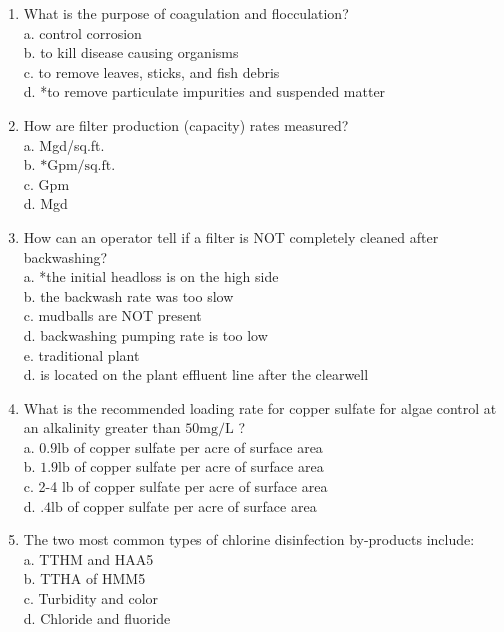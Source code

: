 \begin{enumerate}
\item What is the purpose of coagulation and flocculation?\\
a. control corrosion\\
b. to kill disease causing organisms\\
c. to remove leaves, sticks, and fish debris\\
d. *to remove particulate impurities and suspended matter\\
\item How are filter production (capacity) rates measured?\\
a. Mgd/sq.ft.\\
b. $* \mathrm{Gpm} / \mathrm{sq} . \mathrm{ft}$.\\
c. $\mathrm{Gpm}$\\
d. Mgd\\
\item How can an operator tell if a filter is NOT completely cleaned after backwashing?\\
a. *the initial headloss is on the high side\\
b. the backwash rate was too slow\\
c. mudballs are NOT present\\
d. backwashing pumping rate is too low\\
e. traditional plant\\
d. is located on the plant effluent line after the clearwell\\
\item What is the recommended loading rate for copper sulfate for algae control at an alkalinity greater than $50 \mathrm{mg} / \mathrm{L}$ ?\\
a. $0.9 \mathrm{lb}$ of copper sulfate per acre of surface area\\
b. $1.9 \mathrm{lb}$ of copper sulfate per acre of surface area\\
c. 2-4 lb of copper sulfate per acre of surface area\\
d. $.4 \mathrm{lb}$ of copper sulfate per acre of surface area\\
\item The two most common types of chlorine disinfection by-products include:\\
a. TTHM and HAA5\\
b. TTHA of HMM5\\
c. Turbidity and color\\
d. Chloride and fluoride\\

\end{enumerate}
